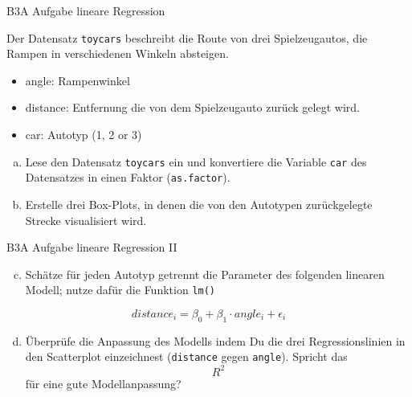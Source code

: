 \documentclass[
  ignorenonframetext,
]{beamer}
\providecommand{\tightlist}{%
  \setlength{\itemsep}{0pt}\setlength{\parskip}{0pt}}
\begin{document}
\begin{frame}[fragile]{B3A Aufgabe lineare Regression}
\protect\hypertarget{b3a-aufgabe-lineare-regression}{}

Der Datensatz \texttt{toycars} beschreibt die Route von drei
Spielzeugautos, die Rampen in verschiedenen Winkeln absteigen.

\begin{itemize}
\tightlist
\item
  angle: Rampenwinkel
\item
  distance: Entfernung die von dem Spielzeugauto zurück gelegt wird.
\item
  car: Autotyp (1, 2 or 3)
\end{itemize}

\begin{enumerate}
[a)]
\tightlist
\item
  Lese den Datensatz \texttt{toycars} ein und konvertiere die Variable
  \texttt{car} des Datensatzes in einen Faktor (\texttt{as.factor}).
\end{enumerate}

\begin{enumerate}
[(a)]
\setcounter{enumi}{1}
\tightlist
\item
  Erstelle drei Box-Plots, in denen die von den Autotypen zurückgelegte
  Strecke visualisiert wird.
\end{enumerate}

\end{frame}

\begin{frame}[fragile]{B3A Aufgabe lineare Regression II}
\protect\hypertarget{b3a-aufgabe-lineare-regression-ii}{}

\begin{enumerate}
[(a)]
\setcounter{enumi}{2}
\tightlist
\item
  Schätze für jeden Autotyp getrennt die Parameter des folgenden
  linearen Modell; nutze dafür die Funktion \texttt{lm()}
\end{enumerate}

\[ distance_i= \beta_0 + \beta_1 \cdot angle_i + \epsilon_i\]

\begin{enumerate}
[(a)]
\setcounter{enumi}{3}
\tightlist
\item
  Überprüfe die Anpassung des Modells indem Du die drei
  Regressionslinien in den Scatterplot einzeichnest (\texttt{distance}
  gegen \texttt{angle}). Spricht das \[ R^2 \] für eine gute
  Modellanpassung?
\end{enumerate}

\end{frame}
\end{document}
